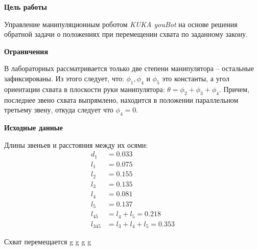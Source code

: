 
\textbf{Цель работы} 

Управление манипуляционным роботом \textit{KUKA youBot} на основе решения обратной задачи о положениях при перемещении схвата по заданному закону.

\textbf{Ограничения}

В лабораторных рассматривается только две степени манипулятора -- остальные зафиксированы. Из этого следует, что: $ \phi_1, \phi_4 $ и $ \phi_5 $ это константы, а угол ориентации схвата в плоскости руки манипулятора: $\theta = \phi_2+\phi_3+\phi_4$. Причем, последнее звено схвата выпрямлено, находится в положении параллельном третьему звену, откуда следует что $ \phi_4=0 $.

\textbf{Исходные данные}

Длины звеньев и расстояния между их осями:
\begin{align*}
    d_1 &= 0.033 \\
    l_1 &= 0.075 \\
    l_2 &= 0.155 \\
    l_3 &= 0.135 \\
    l_4 &= 0.081 \\
    l_5 &= 0.137 \\
    l_{45} &= l_4+l_5 = 0.218 \\
    l_{345} &= l_3 + l_4 + l_5 = 0.353
\end{align*}

Схват перемещается g g g g 